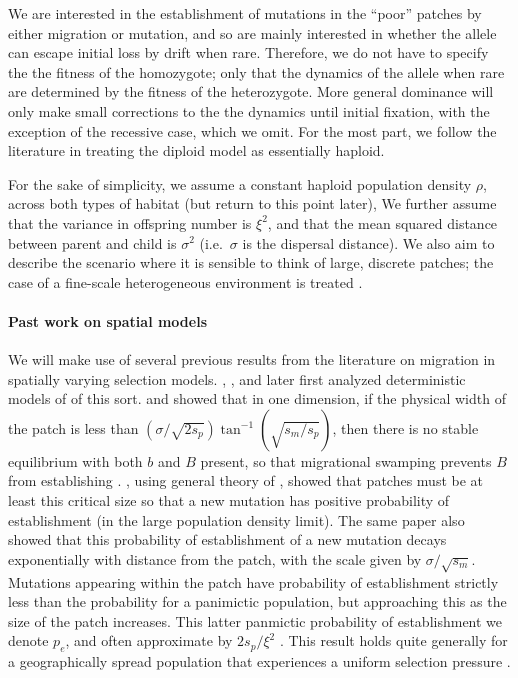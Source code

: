 \documentclass{article}
\begin{document}
We are interested in the establishment of mutations in the ``poor'' patches by either
migration or mutation, and so are mainly interested in whether the allele
can escape initial loss by drift when rare. 
Therefore, we do not have to specify the the fitness of the homozygote; 
only that the dynamics of the allele when rare 
are determined by the fitness of the heterozygote. 
More general dominance will only make small corrections to the the dynamics until initial fixation,
with the exception of the recessive case, which we omit.
For the most part, 
we follow the literature in treating the diploid model as essentially haploid.

For the sake of simplicity, we assume a constant haploid population density $\rho$, 
across both types of habitat (but return to this point later),
We further assume that the variance in offspring number is $\xi^2$, 
and that the mean squared distance between parent and child is $\sigma^2$
(i.e.\ $\sigma$ is the dispersal distance).
We also aim to describe the scenario where it is sensible to think of large, discrete patches;
the case of a fine-scale heterogeneous environment is treated \citep{elsewhere}.

\paragraph{Past work on spatial models}
We will make use of several previous results from the literature on
migration in spatially varying selection models. 
\citet{haldane1948theory}, \citet{fisher1950frequencies}, and later \citet{slatkin1973geneflow} first analyzed
deterministic models of of this sort.
\citet{nagylaki1975conditions} and \citet{conley1975application} showed that in one dimension, if the physical width of the patch is less than $(\sigma/\sqrt{2s_p}) \tan^{-1} (\sqrt{s_m/s_p})$, 
then there is no stable equilibrium with both $b$ and $B$ present,  %
so that migrational swamping prevents $B$ from establishing \citep[see also][ for a review]{lenormand2002limits}.
\citet{barton1987establishment}, using general theory of \citet{pollak1966survival}, showed  
that patches must be at least this critical size so that a new mutation has positive probability of establishment
(in the large population density limit).
The same paper also showed that
this probability of establishment of a new mutation decays exponentially with distance from the patch, 
with the scale given by $\sigma/\sqrt{s_m}$. Mutations appearing within the patch have probability of establishment
strictly less than the probability for a panimictic population,
but approaching this as the size of the patch increases.
This latter panmictic probability of establishment we denote $p_e$,
and often approximate by $2 s_p / \xi^2$ \citep{haldane1927mathematical,fisher1930genetical}.
This result holds quite generally for a geographically spread population that experiences a uniform selection
pressure \citep{maruyama1970fixation,cherry2003diffusion}. 
\end{document}
